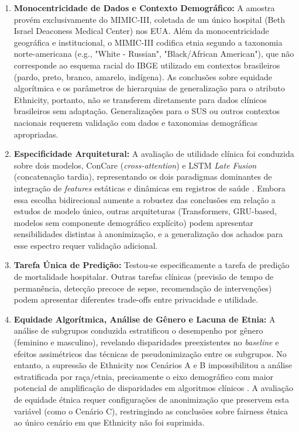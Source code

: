 \begin{enumerate}
    \item \textbf{Monocentricidade de Dados e Contexto Demográfico:} A amostra provém exclusivamente do MIMIC-III, coletada de um único hospital (Beth Israel Deaconess Medical Center) nos EUA. Além da monocentricidade geográfica e institucional, o MIMIC-III codifica etnia segundo a taxonomia norte-americana (e.g., "White - Russian", "Black/African American"), que não corresponde ao esquema racial do IBGE utilizado em contextos brasileiros (pardo, preto, branco, amarelo, indígena). As conclusões sobre equidade algorítmica e os parâmetros de hierarquias de generalização para o atributo Ethnicity, portanto, não se transferem diretamente para dados clínicos brasileiros sem adaptação. Generalizações para o SUS ou outros contextos nacionais requerem validação com dados e taxonomias demográficas apropriadas.
    
    \item \textbf{Especificidade Arquitetural:} A avaliação de utilidade clínica foi conduzida sobre dois modelos, ConCare (\textit{cross-attention}) e LSTM \textit{Late Fusion} (concatenação tardia), representando os dois paradigmas dominantes de integração de \textit{features} estáticas e dinâmicas em registros de saúde \cite{Shickel2018}. Embora essa escolha bidirecional aumente a robustez das conclusões em relação a estudos de modelo único, outras arquiteturas (Transformers, GRU-based, modelos sem componente demográfico explícito) podem apresentar sensibilidades distintas à anonimização, e a generalização dos achados para esse espectro requer validação adicional.
    
    \item \textbf{Tarefa Única de Predição:} Testou-se especificamente a tarefa de predição de mortalidade hospitalar. Outras tarefas clínicas (previsão de tempo de permanência, detecção precoce de sepse, recomendação de intervenções) podem apresentar diferentes trade-offs entre privacidade e utilidade.
    
    \item \textbf{Equidade Algorítmica, Análise de Gênero e Lacuna de Etnia:} A análise de subgrupos conduzida estratificou o desempenho por gênero (feminino e masculino), revelando disparidades preexistentes no \textit{baseline} e efeitos assimétricos das técnicas de pseudonimização entre os subgrupos. No entanto, a supressão de Ethnicity nos Cenários A e B impossibilitou a análise estratificada por raça/etnia, precisamente o eixo demográfico com maior potencial de amplificação de disparidades em algoritmos clínicos \cite{Obermeyer2019}. A avaliação de equidade étnica requer configurações de anonimização que preservem esta variável (como o Cenário C), restringindo as conclusões sobre fairness étnica ao único cenário em que Ethnicity não foi suprimida.
    

\end{enumerate}
